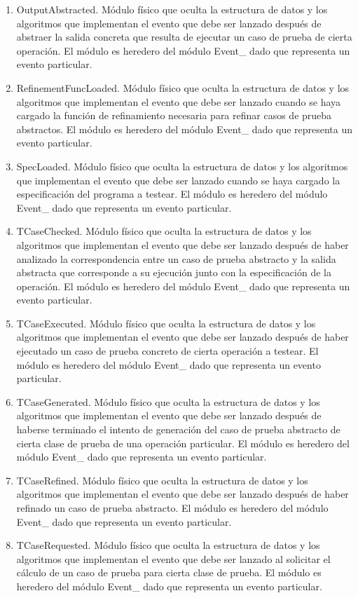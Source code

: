 \documentclass[a4paper,10pt]{report}
\begin{document}
\begin{enumerate}
					\item{OutputAbstracted. Módulo físico que oculta la estructura de datos y los algoritmos que implementan el evento que debe ser lanzado después de abstraer la salida concreta que resulta de ejecutar un caso de prueba de cierta operación. El módulo es heredero del módulo Event\_ dado que representa un evento particular.}
					\item{RefinementFuncLoaded. Módulo físico que oculta la estructura de datos y los algoritmos que implementan el evento que debe ser lanzado cuando se haya cargado la función de refinamiento necesaria para refinar casos de prueba abstractos. El módulo es heredero del módulo Event\_ dado que representa un evento particular.}
					\item{SpecLoaded. Módulo físico que oculta la estructura de datos y los algoritmos que implementan el evento que debe ser lanzado cuando se haya cargado la especificación del programa a testear. El módulo es heredero del módulo Event\_ dado que representa un evento particular.}
					\item{TCaseChecked. Módulo físico que oculta la estructura de datos y los algoritmos que implementan el evento que debe ser lanzado después de haber analizado la correspondencia entre un caso de prueba abstracto y la salida abstracta que corresponde a su ejecución junto con la especificación de la operación. El módulo es heredero del módulo Event\_ dado que representa un evento particular.}
					\item{TCaseExecuted. Módulo físico que oculta la estructura de datos y los algoritmos que implementan el evento que debe ser lanzado después de haber ejecutado un caso de prueba concreto de cierta operación a testear. El módulo es heredero del módulo Event\_ dado que representa un evento particular.}
					\item{TCaseGenerated. Módulo físico que oculta la estructura de datos y los algoritmos que implementan el evento que debe ser lanzado después de haberse terminado el intento de generación del caso de prueba abstracto de cierta clase de prueba de una operación particular. El módulo es heredero del módulo Event\_ dado que representa un evento particular.}
					\item{TCaseRefined. Módulo físico que oculta la estructura de datos y los algoritmos que implementan el evento que debe ser lanzado después de haber refinado un caso de prueba abstracto. El módulo es heredero del módulo Event\_ dado que representa un evento particular.}
					\item{TCaseRequested. Módulo físico que oculta la estructura de datos y los algoritmos que implementan el evento que debe ser lanzado al solicitar el cálculo de un caso de prueba para cierta clase de prueba. El módulo es heredero del módulo Event\_ dado que representa un evento particular.}

\end{enumerate}
\end{document}
